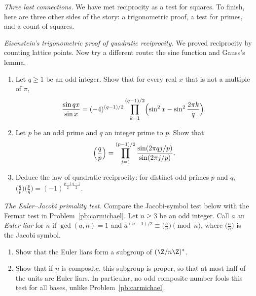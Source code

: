 \medskip
\noindent\emph{Three last connections.} We have met reciprocity as a
test for squares. To finish, here are three other sides of the story:
a trigonometric proof, a test for primes, and a count of squares.

\begin{exercise}[Journey]\label{pb:eisensine}
\emph{Eisenstein's trigonometric proof of quadratic reciprocity.}
We proved reciprocity by counting lattice points. Now try a different
route: the sine function and Gauss's lemma.
\begin{enumerate}[label=(\alph*)]
\item Let $q\ge1$ be an odd integer. Show that for every real $x$ that is not a multiple of $\pi$,
\[
\frac{\sin qx}{\sin x}=(-4)^{(q-1)/2}\prod_{k=1}^{(q-1)/2}\Bigl(\sin^2x-\sin^2\frac{2\pi k}q\Bigr).
\]
\item Let $p$ be an odd prime and $q$ an integer prime to $p$. Show that
\[
\Bigl(\frac qp\Bigr)=\prod_{j=1}^{(p-1)/2}\frac{\sin(2\pi qj/p)}{\sin(2\pi j/p)}.
\]
\item Deduce the law of quadratic reciprocity: for distinct odd primes $p$ and $q$,
$\bigl(\frac qp\bigr)\bigl(\frac pq\bigr)=(-1)^{\frac{p-1}2\frac{q-1}2}$.
\end{enumerate}
\end{exercise}

\begin{exercise}[$\star\star$]\label{pb:euler}
\emph{The Euler--Jacobi primality test.}
Compare the Jacobi-symbol test below with the Fermat test in
Problem~\ref{pb:carmichael}.
Let $n\ge3$ be an odd integer. Call $a$ an \emph{Euler liar} for $n$ if $\gcd(a,n)=1$ and $a^{(n-1)/2}\equiv\bigl(\frac an\bigr)\pmod n$, where
$\bigl(\frac an\bigr)$ is the Jacobi symbol.
\begin{enumerate}[label=(\alph*)]
\item Show that the Euler liars form a subgroup of $(\Z/n\Z)^*$.
\item Show that if $n$ is composite, this subgroup is proper, so that at most half of the units are Euler liars. In
particular, no odd composite number fools this test for all bases, unlike Problem~\ref{pb:carmichael}.
\end{enumerate}
\end{exercise}

